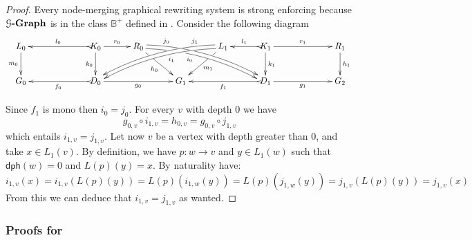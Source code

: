 \documentclass[a4paper,UKenglish,cleveref,pdftex, thm-restate,numberwithinsect,anonymous]{lipics}
\newcommand{\gph}[1]{\mathcal{G}\textbf{\textup{-Graph}}}
\newcommand{\dph}{\mathsf{dph}}
\def\G{\textbf {\textup{G}}}
\begin{document}
\lemVTame*
\label{lemVTame}


\begin{proof}
	Every node-merging graphical rewriting system is strong enforcing because $\gph{G}$ is in the class $\mathbb{B}^+$ defined in .  Consider the following diagram 
	\[\xymatrix@R=25pt@C=30pt{L_0 \ar[d]_{m_0}&& K_0
		\ar[d]_{k_0}\ar@{>->}[ll]_{l_0} \ar[r]^{r_0} & R_0
		\ar@<-.5ex>@/^.35cm/[drrr]|(.23)\hole|(.34)\hole_(.4){i_0} 	\ar@<.5ex>@/^.35cm/[drrr]^(.2){j_0}|(.31)\hole |(.4)\hole
		\ar[dr]|(.3)\hole_{h_0} && L_1 \ar@<.5ex>@/_.35cm/[dlll]^(.4){i_1} \ar@<-.5ex>@/_.35cm/[dlll]_(.2){j_1}
		\ar[dl]|(.3)\hole^{m_1}& K_1 \ar[d]^{k_1}\ar@{>->}[l]_{l_1}
		\ar[rr]^{r_1} && R_1 \ar[d]^{h_1}\\G_0 && \ar@{>->}[ll]^{f_0}
		D_0 \ar[rr]_{g_0}&& G_1 && \ar@{>->}[ll]^{f_1} D_1
		\ar[rr]_{g_1}&& G_2}\] 
	
	Since $f_1$ is mono then $i_0=j_0$. For every $v$ with depth $0$ we have
	\[g_{0,v}\circ i_{1,v}=h_{0,v}=g_{0,v}\circ j_{1,v}\]
	which entails $i_{1,v}=j_{1,v}$. Let now $v$ be a vertex with depth greater than $0$, and take $x\in L_1(v)$. By definition, we have $p:w\to v$ and $y\in L_{1}(w)$  such that $\dph(w)=0$ and $L(p)(y)=x$. By naturality have:
	\[i_{1,v}(x)=i_{1,v}(L(p)(y))=L(p)(i_{1, w}(y))=L(p)(j_{1, w}(y))=j_{1,v}(L(p)(y))=j_{1,v}(x)\]
	From this we can deduce that $i_{1,v}=j_{1,v}$ as wanted.
\end{proof}

\subsubsection{Proofs for }
\end{document}

